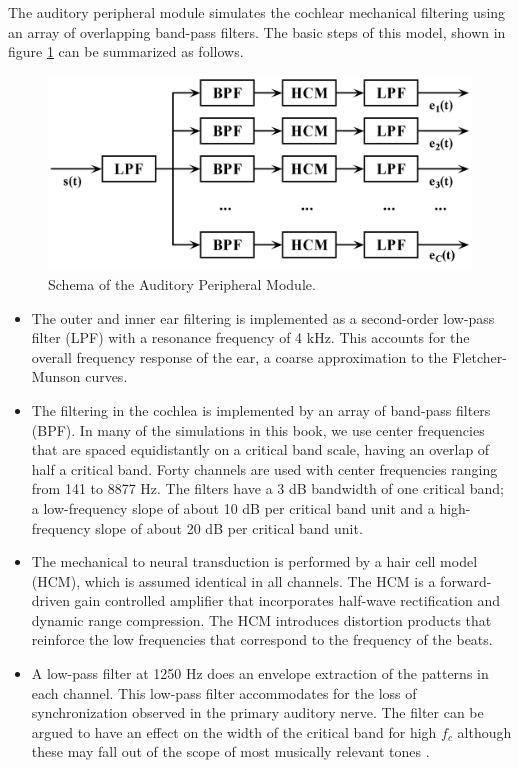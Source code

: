 The auditory peripheral module simulates the cochlear mechanical
filtering using an array of overlapping band-pass filters.
The basic steps of this model, shown in figure
\ref{Fig:AuditoryModel} can be summarized as follows.

\begin{figure}[h]
    \centering
    \includegraphics[width=\IPEMDefaultFigureWidth]{Graphics/AuditoryModel}
    \caption{Schema of the Auditory Peripheral Module. }
    \label{Fig:AuditoryModel}
\end{figure}

\begin{itemize}
\item
    The outer and inner ear filtering is implemented as a
    second-order low-pass filter (LPF) with a resonance frequency of
    4 kHz. This accounts for the overall frequency response of the
    ear, a coarse approximation to the Fletcher-Munson curves.
\item
    The filtering in the cochlea is implemented by an array of
    band-pass filters (BPF). In many of the simulations in this book,
    we use center frequencies that are spaced equidistantly on a
    critical band scale, having an overlap of half a critical band.
    Forty channels are used with center frequencies ranging from 141
    to 8877 Hz. The filters have a 3 dB bandwidth of one critical
    band; a low-frequency slope of about 10 dB per critical band unit
    and a high-frequency slope of about 20 dB per critical band unit.
\item
    The mechanical to neural transduction is performed by a hair cell
    model (HCM), which is assumed identical in all channels. The HCM
    is a forward-driven gain controlled amplifier that incorporates
    half-wave rectification and dynamic range compression. The HCM
    introduces distortion products that reinforce the low frequencies
    that correspond to the frequency of the beats.
\item
    A low-pass filter at 1250 Hz does an envelope extraction of the
    patterns in each channel. This low-pass filter accommodates for
    the loss of synchronization observed in the primary auditory
    nerve. The filter can be argued to have an effect on the width of
    the critical band for high $f_c$ although these may fall out of
    the scope of most musically relevant tones
    \cite{GreenwoodJoris:1996}.
\end{itemize}

